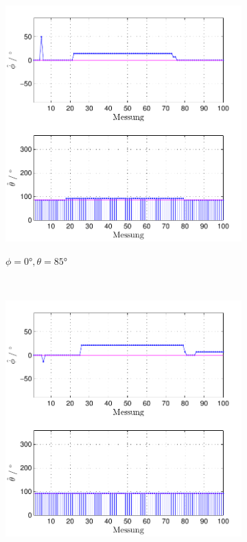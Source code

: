 \begin{figure}
\begin{subfigure}[b]{0.48\textwidth}
                \includegraphics[width=\textwidth]{images/04_Echtzeitversuch/MALE_Phi_0_Theta_85}
                \label{fig:Foto_DSP_Draufsicht}
                \caption{$\phi=0°, \theta = 85°$}
        \end{subfigure}
        ~ %
        \begin{subfigure}[b]{0.48\textwidth}
                \centering
                \includegraphics[width=\textwidth]{images/04_Echtzeitversuch/MALE_Phi_0_Theta_92}

\end{subfigure}
\end{figure}
